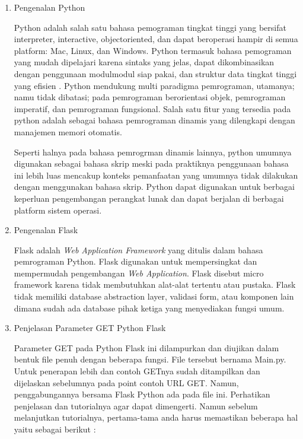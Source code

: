     \begin{enumerate}
        \item Pengenalan Python

        Python adalah salah satu bahasa pemograman tingkat tinggi yang bersifat interpreter, interactive, objectoriented, dan dapat beroperasi hampir di semua platform: Mac, Linux, dan Windows. Python termasuk bahasa pemograman yang mudah dipelajari karena sintaks yang jelas, dapat dikombinasikan dengan penggunaan modulmodul siap pakai, dan struktur data tingkat tinggi yang efisien \cite{kadir2005dasar}. Python mendukung multi paradigma pemrograman, utamanya; namu tidak dibatasi; pada pemrograman berorientasi objek, pemrograman imperatif, dan pemrograman fungsional. Salah satu fitur yang tersedia pada python adalah sebagai bahasa pemrograman dinamis yang dilengkapi dengan manajemen memori otomatis.

        Seperti halnya pada bahasa pemrogrman dinamis lainnya, python umumnya digunakan sebagai bahasa skrip meski pada praktiknya penggunaan bahasa ini lebih luas mencakup konteks pemanfaatan yang umumnya tidak dilakukan dengan menggunakan bahasa skrip. Python dapat digunakan untuk berbagai keperluan pengembangan perangkat lunak dan dapat berjalan di berbagai platform sistem operasi.

        \item Pengenalan Flask
        
         Flask adalah \textit{Web Application Framework} yang ditulis dalam bahasa pemrograman Python. Flask digunakan untuk mempersingkat dan mempermudah pengembangan \textit{Web Application}\cite{lokhande2015efficient}. Flask disebut micro framework karena tidak membutuhkan alat-alat tertentu atau pustaka. Flask tidak memiliki database abstraction layer, validasi form, atau komponen lain dimana sudah ada database pihak ketiga yang menyediakan fungsi umum.
         
        \item Penjelasan Parameter GET Python Flask
        
        Parameter GET pada Python Flask ini dilampurkan dan diujikan dalam bentuk file penuh dengan beberapa fungsi. File tersebut bernama Main.py. Untuk penerapan lebih dan contoh GETnya sudah ditampilkan dan dijelaskan sebelumnya pada point contoh URL GET. Namun, penggabungannya bersama Flask Python ada pada file ini. Perhatikan penjelasan dan tutorialnya agar dapat dimengerti. Namun sebelum melanjutkan tutorialnya, pertama-tama anda harus memastikan beberapa hal yaitu sebagai berikut :
        
    \end{enumerate}

